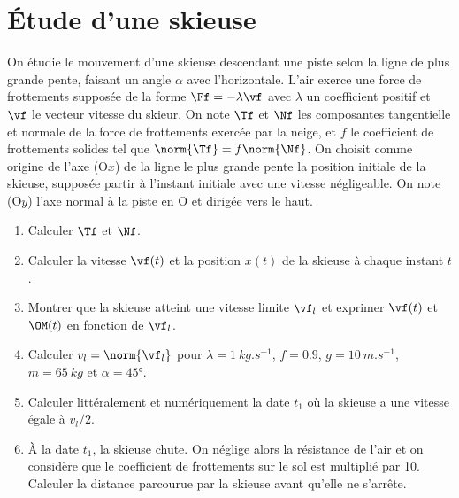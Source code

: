 \documentclass[a4paper, 12pt, final, garamond]{book}
\begin{document}
\section{Étude d'une skieuse}
On étudie le mouvement d'une skieuse descendant une piste selon la ligne de plus
grande pente, faisant un angle $\alpha$ avec l'horizontale. L'air exerce une
force de frottements supposée de la forme $\Ff = -\lambda\vf$ avec $\lambda$ un
coefficient positif et $\vf$ le vecteur vitesse du skieur. \bigbreak
On note $\Tf$ et $\Nf$ les composantes tangentielle et normale de la force de
frottements exercée par la neige, et $f$ le coefficient de frottements solides
tel que $\norm{\Tf} = f\norm{\Nf}$. \bigbreak
On choisit comme origine de l'axe (O$x$) de la ligne le plus grande pente la
position initiale de la skieuse, supposée partir à l'instant initiale avec une
vitesse négligeable. On note (O$y$) l'axe normal à la piste en O et dirigée vers
le haut.
\begin{enumerate}
    \item Calculer $\Tf$ et $\Nf$.
    \item Calculer la vitesse $\vf(t)$ et la position $x(t)$ de la skieuse à
        chaque instant $t$.
    \item Montrer que la skieuse atteint une vitesse limite $\vf_l$ et exprimer
        $\vf(t)$ et $\OM(t)$ en fonction de $\vf_l$.
    \item Calculer $v_l = \norm{\vf_l}$ pour $\lambda = \SI{1}{kg.s^{-1}}$, $f =
        \num{0.9}$, $g = \SI{10}{m.s^{-1}}$, $m = \SI{65}{kg}$ et $\alpha =
        \ang{45;;}$.
    \item Calculer littéralement et numériquement la date $t_1$ où la skieuse a
        une vitesse égale à $v_l/2$.
    \item À la date $t_1$, la skieuse chute. On néglige alors la résistance de
        l'air et on considère que le coefficient de frottements sur le sol est
        multiplié par 10. Calculer la distance parcourue par la skieuse avant
        qu'elle ne s'arrête.
\end{enumerate}
\end{document}
